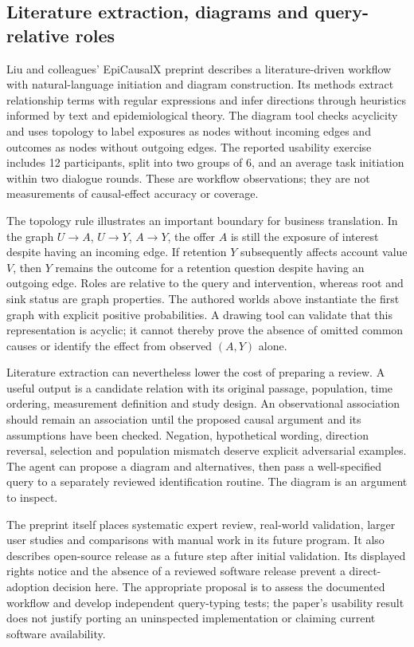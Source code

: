 \subsection{Literature extraction, diagrams and query-relative roles}

Liu and colleagues' EpiCausalX preprint describes a literature-driven
workflow with natural-language initiation and diagram construction. Its
methods extract relationship terms with regular expressions and infer
directions through heuristics informed by text and epidemiological theory.
The diagram tool checks acyclicity and uses topology to label exposures as
nodes without incoming edges and outcomes as nodes without outgoing edges.
The reported usability exercise includes 12 participants, split into two
groups of 6, and an average task initiation within two dialogue rounds.
These are workflow observations; they are not measurements of causal-effect
accuracy or coverage.\citep{exec17_frontier_liu}

The topology rule illustrates an important boundary for business translation.
In the graph $U\to A$, $U\to Y$, $A\to Y$, the offer $A$ is still the
exposure of interest despite having an incoming edge. If retention $Y$
subsequently affects account value $V$, then $Y$ remains the outcome for a
retention question despite having an outgoing edge. Roles are relative to
the query and intervention, whereas root and sink status are graph
properties. The authored worlds above instantiate the first graph with
explicit positive probabilities. A drawing tool can validate that this
representation is acyclic; it cannot thereby prove the absence of omitted
common causes or identify the effect from observed $(A,Y)$ alone.
\citep{exec17_frontier_exact}

Literature extraction can nevertheless lower the cost of preparing a review.
A useful output is a candidate relation with its original passage, population,
time ordering, measurement definition and study design. An observational
association should remain an association until the proposed causal argument
and its assumptions have been checked. Negation, hypothetical wording,
direction reversal, selection and population mismatch deserve explicit
adversarial examples. The agent can propose a diagram and alternatives, then
pass a well-specified query to a separately reviewed identification routine.
The diagram is an argument to inspect.

The preprint itself places systematic expert review, real-world validation,
larger user studies and comparisons with manual work in its future program.
It also describes open-source release as a future step after initial
validation. Its displayed rights notice and the absence of a reviewed
software release prevent a direct-adoption decision here. The appropriate
proposal is to assess the documented workflow and develop independent
query-typing tests; the paper's usability result does not justify porting an
uninspected implementation or claiming current software availability.
\citep{exec17_frontier_liu}

